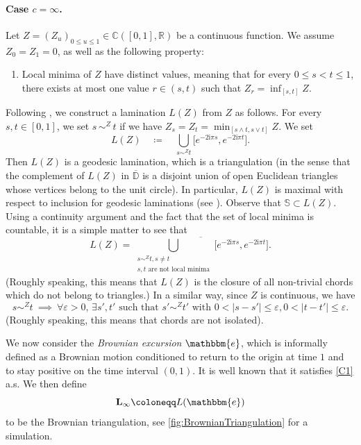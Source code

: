 \documentclass[10pt]{amsart}
\theoremstyle{definition}\newtheorem{defi}[theo]{Definition}\newtheorem{rema}[theo]{Remark}\newtheorem{exam}[theo]{Example}\newtheorem{exem}[theo]{Example}\newtheorem{nota}[theo]{Notation}
\newcommand{\R}{\mathbb{R}}
\def\S{\mathbb{S}}
\renewcommand{\epsilon}{\varepsilon}
\begin{document}
\paragraph*{Case $c=\infty$.}  Let $Z=(Z_{u})_{0 \leq u \leq 1} \in \mathbb{C}([0,1],\R)$ be a continuous function.
We assume \hbox{$Z_{0}=Z_{1}=0$}, as well as the following property:
\begin{enumerate}[label=\color{blue}(C\arabic*)]
\item\label{C1} Local minima of $Z$ have distinct values,
  meaning that for every $0 \le s < t \le 1$, there exists at most one value $r \in (s, t)$ such that $Z_{r} = \inf_{[s, t]} Z$.
\end{enumerate}
Following \cite{Ald94a,LGP08}, we construct a lamination $L(Z)$ from $Z$ as follows.
For
every $s,t \in [0,1]$, we set $s \, {\sim}^{Z}\,  t$ if we have $Z_{s}
=Z_{t} = \min_{[s\wedge t, s \vee t]} Z$. We  set
 \begin{equation}
 \label{eq:defbl}
L(Z) \quad \coloneqq \quad  \bigcup_{s \sim^{Z} t} \big[e^{-2\textrm{i} \pi s},e^{-2\textrm{i} \pi t}\big].
 \end{equation}
 Then $L(Z) $ is a geodesic lamination, which is a triangulation (in the sense that the
complement of $ L(Z) $ in $\overline{ \mathbb{D}}$ is a
disjoint union of open Euclidean triangles whose vertices belong to
the unit circle).  In particular,  $L(Z) $ is maximal with respect to inclusion for geodesic laminations (see \cite[Proposition 2.1]{LGP08}). Observe that $\S \subset  L(Z)$.
Using a continuity argument and the fact that the set of local minima is countable, it is a simple matter to see that
 \begin{equation}
 \label{eq:adherence}
 L(Z)= \overline{ \bigcup_{\substack{s \sim^{Z} t, s \neq t\\ s,t \textrm{ are not local minima}}} \big[e^{-2\textrm{i} \pi s},e^{-2\textrm{i} \pi t}\big]}.
 \end{equation}
 (Roughly speaking, this means that $ L(Z)$ is the closure of all non-trivial chords which do not belong to triangles.)
 In a similar way, since $Z$ is continuous, we have
  \begin{equation}
 \label{eq:isolated} s \sim^{Z} t \ \implies \  \forall \epsilon>0,\, \exists s',t' \textrm{ such that }  s' \sim^{Z} t'  \textrm{ with } 0<|s-s'| \leq \epsilon, 0<|t-t'| \leq \epsilon.
  \end{equation}
 (Roughly speaking, this means that  chords are not isolated).

 We now consider the {\em Brownian excursion} $\mathbbm{e}$,
 which is informally defined as a Brownian motion
 conditioned to return to the origin at time $1$ and to stay positive on the time interval $(0,1)$.
 It is well known that it satisfies \ref{C1}
 a.s.  We then define
 \[\mathbf{L}_{\infty} \coloneqq L(\mathbbm{e})\]
 to be the Brownian triangulation, see \cref{fig:BrownianTriangulation} for a simulation.
\end{document}
